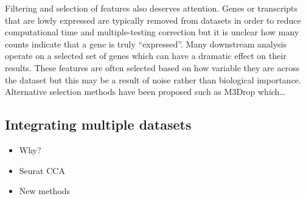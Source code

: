 \documentclass[11pt,a4paper,titlepage,twoside,openright]{style/unimelbthesis}
\theoremstyle{definition}
\theoremstyle{definition}
\theoremstyle{definition}
\theoremstyle{remark}
\begin{document}
\begin{mainmatter}
Filtering and selection of features also deserves attention. Genes or transcripts that are lowly expressed are typically removed from datasets in order to reduce computational time and multiple-testing correction but it is unclear how many counts indicate that a gene is truly ``expressed''. Many downstream analysis operate on a selected set of genes which can have a dramatic effect on their results. These features are often selected based on how variable they are across the dataset but this may be a result of noise rather than biological importance. Alternative selection methods have been proposed such as M3Drop which\ldots{}

\hypertarget{integrating-multiple-datasets}{%
\subsection{Integrating multiple datasets}\label{integrating-multiple-datasets}}

\begin{itemize}
\tightlist
\item
  Why?
\item
  Seurat CCA
\item
  New methods
\end{itemize}


\end{mainmatter}
\end{document}
